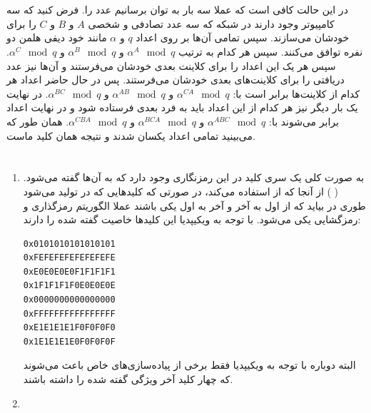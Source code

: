 \documentclass[]{article}
\begin{document}
\section{}
در این حالت کافی است که عملا سه بار به توان برسانیم عدد را.
فرض کنید که سه کامپیوتر وجود دارند در شبکه که سه عدد تصادفی و شخصی
$A$ و $B$ و $C$
را برای خودشان می‌سازند. سپس تمامی آن‌ها بر روی اعداد
$q$ و $\alpha$
مانند خود دیفی هلمن دو نفره توافق می‌کنند. سپس هر کدام به ترتیب
$\alpha^A \mod q$ و $\alpha^B \mod q$ و $\alpha^C \mod q$.
سپس هر یک این اعداد را برای کلاینت بعدی خودشان می‌فرستند و آن‌ها نیز عدد دریافتی را برای کلاینت‌های
بعدی خودشان می‌فرستند. پس در حال حاضر اعداد هر کدام از کلاینت‌ها برابر است با:
$\alpha^{CA} \mod q$ و $\alpha^{AB} \mod q$ و $\alpha^{BC} \mod q$.
در نهایت یک بار دیگر نیز هر کدام از این اعداد باید به فرد بعدی فرستاده شود و در نهایت اعداد برابر می‌شوند با:
$\alpha^{ABC} \mod q$ و $\alpha^{BCA} \mod q$ و $\alpha^{CBA} \mod q$.
همان طور که می‌بینید تمامی اعداد یکسان شدند و نتیجه همان کلید ماست.

\noindent
{}
\section{}
\begin{enumerate}
    \item به صورت کلی یک سری کلید در این رمزنگاری وجود دارد که به آن‌ها  گفته می‌شود.
    ( )
    از آنجا که
     از  استفاده می‌کند،
    در صورتی که کلید‌هایی که در
    تولید می‌شود طوری در بیاید که از اول به آخر و آخر به اول یکی باشند عملا الگوریتم
    رمزگذاری و رمزگشایی یکی می‌شود. با توجه به ویکیپدیا این کلید‌ها خاصیت گفته شده را دارند:
    \begin{latin}
    \begin{lstlisting}
0x0101010101010101
0xFEFEFEFEFEFEFEFE
0xE0E0E0E0F1F1F1F1
0x1F1F1F1F0E0E0E0E
0x0000000000000000
0xFFFFFFFFFFFFFFFF
0xE1E1E1E1F0F0F0F0
0x1E1E1E1E0F0F0F0F
\end{lstlisting}
    \end{latin}
    البته دوباره با توجه به ویکیپدیا فقط برخی از پیاده‌سازی‌های خاص باعث می‌شوند که چهار کلید آخر ویژگی گفته شده را داشته باشند.
    \item %
\end{enumerate}
\section{}
\section{}
\end{document}
